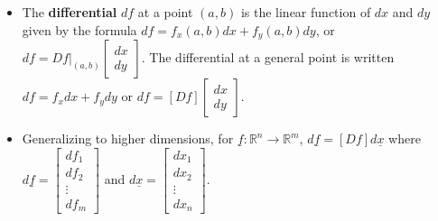 \documentclass[12pt,letterpaper,noanswers]{exam}
\newcommand{\mb}[1]{\underline{#1}}
\begin{document}
\begin{tcolorbox}
\begin{itemize}
\itemsep0em
    \item The \textbf{differential} $df$ at a point $(a,b)$ is the linear function of $dx$ and $dy$ given by the formula $df = f_x(a,b)dx + f_y(a,b)dy$, or $df = \left.Df\right\vert_{(a,b)}\left[\begin{array}{c}dx \\ dy \end{array}\right]$.  The differential at a general point is written $df = f_xdx + f_y dy$ or $df = [Df]\left[\begin{array}{c}dx \\ dy \end{array}\right]$.
\item Generalizing to higher dimensions, for $\mb{f}:\mathbb{R}^n\rightarrow \mathbb{R}^m$, $d\mb{f} = [Df] d\mb{x}$ where $d\mb{f} = \left[\begin{array}{c} df_1 \\ df_2 \\ \vdots \\ df_m \end{array}\right]$ and $d\mb{x} = \left[\begin{array}{c} dx_1 \\ dx_2 \\ \vdots \\ dx_n \end{array}\right]$.

\end{itemize}
\end{tcolorbox}
\end{document}

